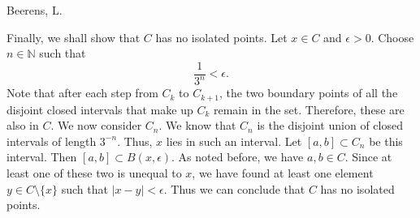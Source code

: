 \begin{solution}[4.9]{Beerens, L.}
\begin{itemize}
        Finally, we shall show that $C$ has no isolated points. Let $x\in C$ and $\epsilon > 0$. Choose $n\in\mathbb{N}$ such that 
        $$
            \frac{1}{3^n}<\epsilon.
        $$
        Note that after each step from $C_k$ to $C_{k+1}$, the two boundary points of all the disjoint closed intervals that make up $C_k$ remain in the set. Therefore, these are also in $C$. We now consider $C_n$. We know that $C_n$ is the disjoint union of closed intervals of length $3^{-n}$. Thus, $x$ lies in such an interval. Let $[a,b]\subset C_n$ be this interval. Then $[a,b]\subset B(x,\epsilon)$. As noted before, we have $a,b\in C$. Since at least one of these two is unequal to $x$, we have found at least one element $y\in C\setminus\{x\}$ such that $|x-y|<\epsilon$. Thus we can conclude that $C$ has no isolated points.
        
    \end{itemize}
\end{solution}

